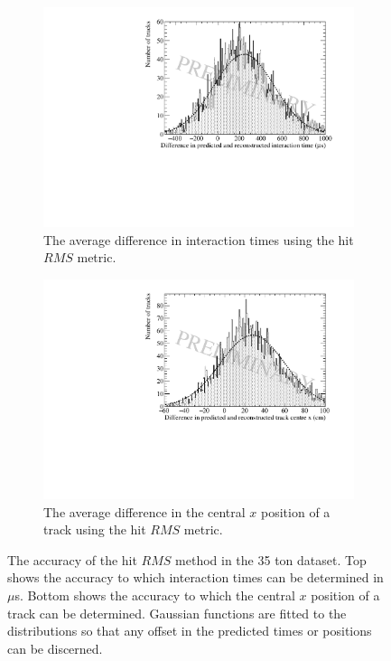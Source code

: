 \begin{figure}
  \centering
  \begin{subfigure}{0.6\textwidth}
    \centering
    \includegraphics[width=\textwidth]{Data_AvTimeDiff_RMS}
    \caption{The average difference in interaction times using the hit $RMS$ metric.}
    \label{fig:DiffDataAvDiff_RMS_T}
  \end{subfigure}

  \begin{subfigure}{0.6\textwidth}
    \centering
    \includegraphics[width=\textwidth]{Data_AvXPosDiff_RMS}
    \caption{The average difference in the central $x$ position of a track using the hit $RMS$ metric.}
    \label{fig:DiffDataAvDiff_RMS_X}
  \end{subfigure}
  \caption[The accuracy of the hit $RMS$ method in the 35 ton dataset]
          {The accuracy of the hit $RMS$ method in the 35 ton dataset. Top shows the accuracy to which interaction times can be determined in $\mu$s. Bottom shows the accuracy to which the central $x$ position of a track can be determined. Gaussian functions are fitted to the distributions so that any offset in the predicted times or positions can be discerned.}
  \label{fig:DiffDataAvDiff_RMS}
\end{figure}

